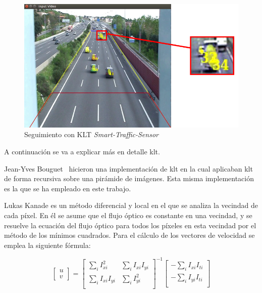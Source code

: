  \begin{figure}[H] 
\begin{center}
   \includegraphics[scale=0.5]{figures/Diseno_global/klt_deteccion.png}
   \caption{Seguimiento con KLT \textit{Smart-Traffic-Sensor}}
	\label{fig.klt_deteccion}
\end{center}
\end{figure}

A continuación se va a explicar más en detalle \acrshort{klt}.

Jean-Yves Bouguet~\cite{klt_bouguet} hicieron una implementación de \acrshort{klt} en la cual aplicaban \acrshort{klt} de forma recursiva sobre una pirámide de imágenes. Esta misma implementación es la que se ha empleado en este trabajo. 

Lukas Kanade es un método diferencial y local en el que se analiza la vecindad de cada píxel. En él se asume que el flujo óptico es constante en una vecindad, y se resuelve la ecuación del flujo óptico para todos los píxeles en esta vecindad por el método de los mínimos cuadrados. Para el cálculo de los vectores de velocidad se emplea la siguiente fórmula:

\begin{equation}\label{klt_formula}
   \begin{bmatrix}u \\ v\end{bmatrix} = \begin{bmatrix}
            \sum_{i}I_{xi}^2 & \sum_{i}I_{xi}I_{yi} \\
            \sum_{i}I_{xi}I_{yi} &  \sum_{i}I_{yi}^2 \\
\end{bmatrix}^{-1} \begin{bmatrix}
-\sum_{i}I_{xi}I_{ti} \\
-\sum_{i}I_{yi}I_{ti} \\
\end{bmatrix}
\end{equation}
\\

